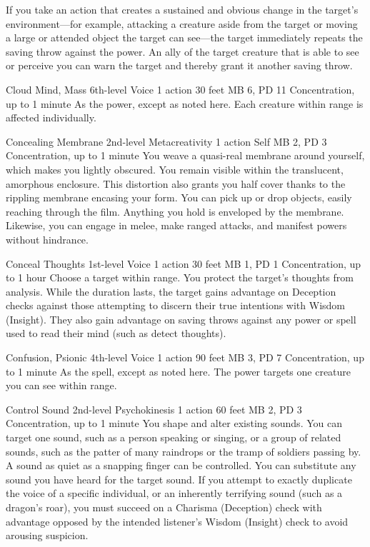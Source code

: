 If you take an action that creates a sustained and obvious change
in the target's environment---for example, attacking a creature
aside from the target or moving a large or attended object
the target can see---the target immediately repeats the
saving throw against the power.
An ally of the target creature that is able to see or perceive you
can warn the target and thereby grant it another saving throw.

\DndPowerHeader%
  {Cloud Mind, Mass}
  {6th-level Voice}
  {1 action}
  {30 feet}
  {MB 6, PD 11}
  {Concentration, up to 1 minute}
As the  power,
except as noted here.
Each creature within range is affected individually.

\DndPowerHeader%
  {Concealing Membrane}
  {2nd-level Metacreativity}
  {1 action}
  {Self}
  {MB 2, PD 3}
  {Concentration, up to 1 minute}
  You weave a quasi-real membrane around yourself,
  which makes you lightly obscured.
  You remain visible within the translucent, amorphous enclosure.
  This distortion also grants you half cover
  thanks to the rippling membrane encasing your form.
  You can pick up or drop objects, easily reaching through the film.
  Anything you hold is enveloped by the membrane.
  Likewise, you can engage in melee, make ranged attacks,
  and manifest powers without hindrance.

\DndPowerHeader%
  {Conceal Thoughts}
  {1st-level Voice}
  {1 action}
  {30 feet}
  {MB 1, PD 1}
  {Concentration, up to 1 hour}
Choose a target within range.
You protect the target's thoughts from analysis.
While the duration lasts, the target gains advantage on
Deception checks against those attempting to discern their
true intentions with Wisdom (Insight).
They also gain advantage on saving throws against any power or spell
used to read their mind (such as detect thoughts).

\DndPowerHeader%
  {Confusion, Psionic}
  {4th-level Voice}
  {1 action}
  {90 feet}
  {MB 3, PD 7}
  {Concentration, up to 1 minute}
As the  spell, except as noted here.
The power targets one creature you can see within range.

\DndPowerHeader%
  {Control Sound}
  {2nd-level Psychokinesis}
  {1 action}
  {60 feet}
  {MB 2, PD 3}
  {Concentration, up to 1 minute}
  You shape and alter existing sounds.
  You can target one sound, such as a person speaking or singing,
  or a group of related sounds,
  such as the patter of many raindrops or the tramp of soldiers passing by.
  A sound as quiet as a snapping finger can be controlled.
  You can substitute any sound you have heard for the target sound.
  If you attempt to exactly duplicate the voice of a specific individual,
  or an inherently terrifying sound (such as a dragon's roar),
  you must succeed on a Charisma (Deception) check with advantage
  opposed by the intended listener's Wisdom (Insight) check
  to avoid arousing suspicion.

